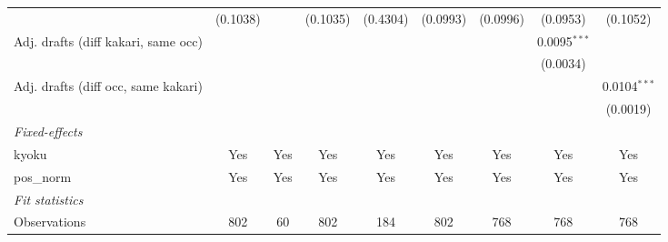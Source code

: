 \begin{table}[htbp]
\begin{threeparttable}
\begin{tabular}{lcccccccc}
                                       & (0.1038)                    &                                  & (0.1035)                         & (0.4304)                            & (0.0993)                            & (0.0996)                 & (0.0953)                              & (0.1052)\\   
   Adj. drafts (diff kakari, same occ) &                             &                                  &                                  &                                     &                                     &                          & 0.0095$^{***}$                        &   \\   
                                       &                             &                                  &                                  &                                     &                                     &                          & (0.0034)                              &   \\   
   Adj. drafts (diff occ, same kakari) &                             &                                  &                                  &                                     &                                     &                          &                                       & 0.0104$^{***}$\\   
                                       &                             &                                  &                                  &                                     &                                     &                          &                                       & (0.0019)\\   
   \midrule
   \emph{Fixed-effects}\\
   kyoku                               & Yes                         & Yes                              & Yes                              & Yes                                 & Yes                                 & Yes                      & Yes                                   & Yes\\  
   pos\_norm                           & Yes                         & Yes                              & Yes                              & Yes                                 & Yes                                 & Yes                      & Yes                                   & Yes\\  
   \midrule
   \emph{Fit statistics}\\
   Observations                        & 802                         & 60                               & 802                              & 184                                 & 802                                 & 768                      & 768                                   & 768\\  

\end{tabular}
\end{threeparttable}
\end{table}
